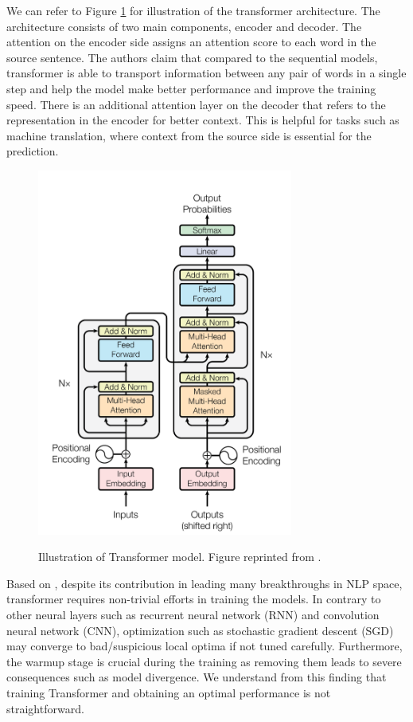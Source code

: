 We can refer to Figure \ref{img:transformer} for illustration of the transformer architecture. The architecture consists of two main components, encoder and decoder. The attention on the encoder side assigns an attention score to each word in the source sentence. The authors claim that compared to the sequential models, transformer is able to transport information between any pair of words in a single step and help the model make better performance and improve the training speed. There is an additional attention layer on the decoder that refers to the representation in the encoder for better context. This is helpful for tasks such as machine translation, where context from the source side is essential for the prediction.

\begin{figure}[h]
    {\includegraphics[width=0.75\textwidth]{img/transformer.png}}
    \centering
    \caption{Illustration of Transformer model. Figure reprinted from \cite{vaswani2017attention}.}
    \label{img:transformer}
\end{figure}

Based on \cite{liu2020understanding}, despite its contribution in leading many breakthroughs in NLP space, transformer requires non-trivial efforts in training the models. In contrary to other neural layers such as recurrent neural network (RNN) and convolution neural network (CNN), optimization such as stochastic gradient descent (SGD) may converge to bad/suspicious local optima if not tuned carefully. Furthermore, the warmup stage is crucial during the training as removing them leads to severe consequences such as model divergence. We understand from this finding that training Transformer and obtaining an optimal performance is not straightforward.

